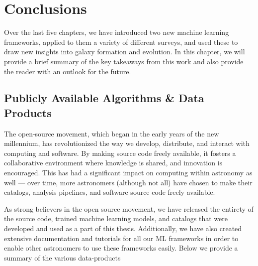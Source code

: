 \chapter{Conclusions} \label{chap:conc}

Over the last five chapters, we have introduced two new machine learning frameworks, applied to them a variety of different surveys, and used these to draw new insights into galaxy formation and evolution. In this chapter, we will provide a brief summary of the key takeaways from this work and also provide the reader with an outlook for the future.

\section{Publicly Available Algorithms \& Data Products} \label{sec_conc:public_products}

The open-source movement, which began in the early years of the new millennium, has revolutionized the way we develop, distribute, and interact with computing and software. By making source code freely available, it fosters a collaborative environment where knowledge is shared, and innovation is encouraged. This has had a significant impact on computing within astronomy as well --- over time, more astronomers (although not all) have chosen to make their catalogs, analysis pipelines, and software source code freely available. 

As strong believers in the open source movement, we have released the entirety of the source code, trained machine learning models, and catalogs that were developed and used as a part of this thesis. Additionally, we have also created extensive documentation and tutorials for all our ML frameworks in order to enable other astronomers to use these frameworks easily. Below we provide a summary of the various data-products

